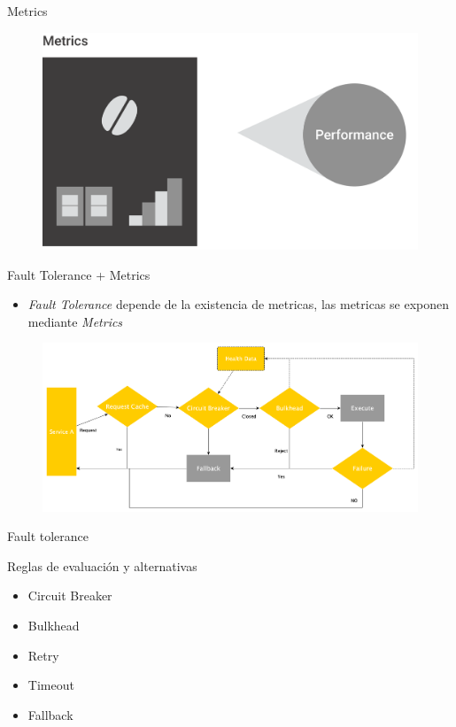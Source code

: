 \documentclass{beamer}
\begin{document}
\begin{frame}{Metrics}
\begin{figure}
	\centering
	\includegraphics[width=0.75\linewidth]{Images/metrics}
\end{figure}
\end{frame}




\begin{frame}{Fault Tolerance + Metrics}

\begin{itemize}
	\item \textit{Fault Tolerance} depende de la existencia de metricas, las metricas se exponen  mediante \textit{Metrics}
\end{itemize}

\begin{figure}
	\centering
	\includegraphics[width=\linewidth]{Images/falldata}
\end{figure}

\end{frame}


\begin{frame}{Fault tolerance}

Reglas de evaluación y alternativas
\begin{itemize}
\item Circuit Breaker
\item Bulkhead
\item Retry
\item Timeout
\item Fallback
\end{itemize}

\end{frame}
\end{document}
